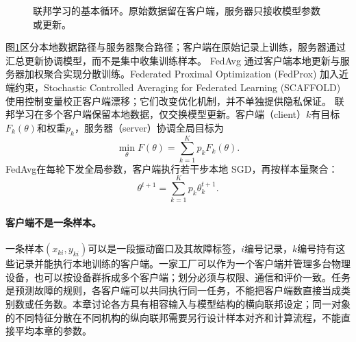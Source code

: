 \begin{figure}[htbp]
\centering
{}
\caption{联邦学习的基本循环。原始数据留在客户端，服务器只接收模型参数或更新。}
\label{fig:federated-basic-loop}
\end{figure}
图\ref{fig:federated-basic-loop}区分本地数据路径与服务器聚合路径；客户端在原始记录上训练，服务器通过汇总更新协调模型，而不是集中收集训练样本。
FedAvg 通过客户端本地更新与服务器加权聚合实现分散训练\cite{mcmahan2017fedavg}。Federated Proximal Optimization (FedProx) 加入近端约束，Stochastic Controlled Averaging for Federated Learning (SCAFFOLD) 使用控制变量校正客户端漂移\cite{li2020fedprox,karimireddy2020scaffold}；它们改变优化机制，并不单独提供隐私保证。
联邦学习在多个客户端保留本地数据，仅交换模型更新。客户端（client）$k$有目标$F_k(\theta)$和权重$p_k$，服务器（server）协调全局目标为
\begin{equation}
 \min_\theta F(\theta)=\sum_{k=1}^{K}p_kF_k(\theta).
\end{equation}
FedAvg在每轮下发全局参数，客户端执行若干步本地 SGD，再按样本量聚合：
\begin{equation}
 \theta^{t+1}=\sum_{k=1}^{K}p_k\theta_k^{t+1}.
\end{equation}

\paragraph{客户端不是一条样本。}
一条样本$(x_{ki},y_{ki})$可以是一段振动窗口及其故障标签，$i$编号记录，$k$编号持有这些记录并能执行本地训练的客户端。一家工厂可以作为一个客户端并管理多台物理设备，也可以按设备群拆成多个客户端；划分必须与权限、通信和评价一致。任务是预测故障的规则，各客户端可以共同执行同一任务，不能把客户端数直接当成类别数或任务数。本章讨论各方具有相容输入与模型结构的横向联邦设定；同一对象的不同特征分散在不同机构的纵向联邦需要另行设计样本对齐和计算流程，不能直接平均本章的参数。

